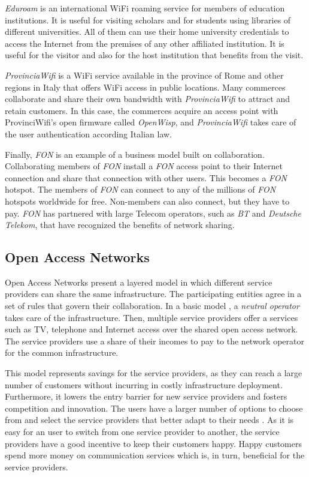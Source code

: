 \documentclass[journal]{IEEEtran}
\begin{document}
\emph{Eduroam} is an international WiFi roaming service for members of education institutions.
It is useful for visiting scholars and for students using libraries of different universities.
All of them can use their home university credentials to access the Internet from the premises of any other affiliated institution.
It is useful for the visitor and also for the host institution that benefits from the visit.

\emph{ProvinciaWifi} is a WiFi service available in the province of Rome and other regions in Italy that offers WiFi access in public locations.
Many commerces collaborate and share their own bandwidth with \emph{ProvinciaWifi} to attract and retain customers.
In this case, the commerces acquire an access point with ProvinciWifi's open firmware called \emph{OpenWisp}, and \emph{ProvinciaWifi} takes care of the user authentication according Italian law.

Finally, \emph{FON} is an example of a business model built on collaboration.
Collaborating members of \emph{FON} install a \emph{FON} access point to their Internet connection and share that connection with other users.
This becomes a \emph{FON} hotspot.
The members of \emph{FON} can connect to any of the millions of \emph{FON} hotspots worldwide for free.
Non-members can also connect, but they have to pay.
\emph{FON} has partnered with large Telecom operators, such as \emph{BT} and \emph{Deutsche Telekom}, that have recognized the benefits of network sharing.


\subsection{Open Access Networks}

Open Access Networks present a layered model in which different service providers can share the same infrastructure.
The participating entities agree in a set of rules that govern their collaboration.
In a basic model \cite{battiti2005wireless}, a \emph{neutral operator} takes care of the infrastructure.
Then, multiple service providers offer a services such as TV, telephone and Internet access over the shared open access network.
The service providers use a share of their incomes to pay to the network operator for the common infrastructure.

This model represents savings for the service providers, as they can reach a large number of customers without incurring in costly infrastructure deployment.
Furthermore, it lowers the entry barrier for new service providers and fosters competition and innovation.
The users have a larger number of options to choose from and select the service providers that better adapt to their needs \cite{domingo2011med}.
As it is easy for an user to switch from one service provider to another, the service providers have a good incentive to keep their customers happy.
Happy customers spend more money on communication services which is, in turn, beneficial for the service providers.
\end{document}
